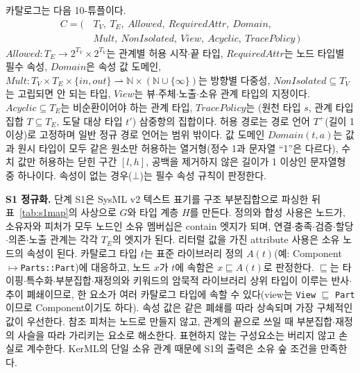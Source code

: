카탈로그는 다음 10-튜플이다.
\begin{equation}
\begin{split}
C = (\,& T_V,\ T_E,\ \mathit{Allowed},\ \mathit{RequiredAttr},\ \mathit{Domain},\\
       & \mathit{Mult},\ \mathit{NonIsolated},\ \mathit{View},\ \mathit{Acyclic},\ \mathit{TracePolicy}\,)
\end{split}
\end{equation}
$\mathit{Allowed} : T_E \rightarrow 2^{T_V} \times 2^{T_V}$는 관계별 허용 시작$\cdot$끝 타입,
$\mathit{RequiredAttr}$는 노드 타입별 필수 속성, $\mathit{Domain}$은 속성 값 도메인,
$\mathit{Mult} : T_V \times T_E \times \{\mathit{in},\mathit{out}\} \rightharpoonup \mathbb{N}
\times (\mathbb{N} \cup \{\infty\})$는 방향별 다중성, $\mathit{NonIsolated} \subseteq T_V$는 고립되면
안 되는 타입, $\mathit{View}$는 뷰$\cdot$주체$\cdot$노출$\cdot$소유 관계 타입의 지정이다.
$\mathit{Acyclic} \subseteq T_E$는 비순환이어야 하는 관계 타입, $\mathit{TracePolicy}$는
(원천 타입 $s$, 관계 타입 집합 $T \subseteq T_E$, 도달 대상 타입 $t'$) 삼중항의 집합이다.
허용 경로는 경로 언어 $T^{+}$(길이 1 이상)로 고정하며 일반 정규 경로 언어는 범위 밖이다. 값 도메인
$\mathit{Domain}(t,a)$는 값과 원시 타입이 모두 같은 원소만 허용하는 열거형(정수 1과 문자열 ``1''은 다르다), 수치
값만 허용하는 닫힌 구간 $[l,h]$, 공백을 제거하지 않은 길이가 1 이상인 문자열형 중 하나이다. 속성이 없는
경우($\bot$)는 필수 속성 규칙이 판정한다.

\textbf{S1 정규화.} 단계 S1은 SysML v2 텍스트 표기를 구조 부분집합으로 파싱한 뒤 표~\ref{tab:s1map}의
사상으로 $G$와 타입 계층 $H$를 만든다. 정의와 합성 사용은 노드가, 소유자와 피처가 모두 노드인 소유
멤버십은 contain 엣지가 되며, 연결$\cdot$충족$\cdot$검증$\cdot$할당$\cdot$의존$\cdot$노출 관계는 각각 $T_E$의
엣지가 된다. 리터럴 값을 가진 attribute 사용은 소유 노드의 속성이 된다. 카탈로그 타입 $t$는 표준 라이브러리
정의 $A(t)$(예: Component$\mapsto$\texttt{Parts::Part})에 대응하고, 노드 $x$가 $t$에 속함은
$x \sqsubseteq A(t)$로 판정한다. $\sqsubseteq$는 타이핑$\cdot$특수화$\cdot$부분집합$\cdot$재정의와 키워드의
암묵적 라이브러리 상위 타입이 이루는 반사$\cdot$추이 폐쇄이므로, 한 요소가 여러 카탈로그 타입에 속할 수
있다(view는 \texttt{View} $\sqsubseteq$ \texttt{Part}이므로 Component이기도 하다). 속성 값은 같은 폐쇄를
따라 상속되며 가장 구체적인 값이 우선한다. 참조 피처는 노드로 만들지 않고, 관계의 끝으로 쓰일 때
부분집합$\cdot$재정의 사슬을 따라 가리키는 요소로 해소한다. 표현하지 않는 구성요소는 버리지 않고 손실로
계수한다. KerML의 단일 소유 관계 때문에 S1의 출력은 소유 숲 조건을 만족한다.

